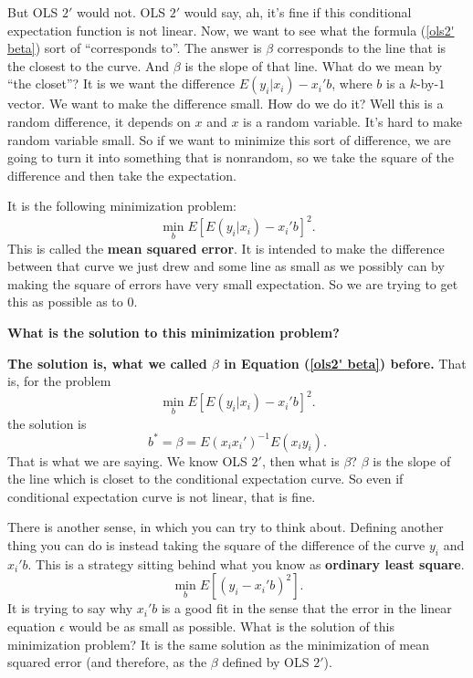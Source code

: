 \documentclass[11pt,a4paper]{amsart}
\theoremstyle{plain}
\theoremstyle{definition}
\begin{document}
 	But OLS $2'$ would not.  OLS $2'$ would say, ah, it's fine if this conditional expectation function is not linear. Now, we want to see what the formula (\ref{ols2' beta}) sort of ``corresponds to''. The answer is $\beta$ corresponds to the line that is the closest to the curve. And $\beta$ is the slope of that line. What do we mean by ``the closet''? It is we want the difference $E(y_{i}|x_{i}) - x_{i}'b$, where $b$ is a $k$-by-$1$ vector.
 	We want to make the difference small. How do we do it? Well this is a random difference, it depends on $x$ and $x$ is a random variable. It's hard to make random variable small. So if we want to minimize this sort of difference, we are going to turn it into something that is nonrandom, so we take the square of the difference and then take the expectation.\par 
	  It is the following minimization problem:
	 \[	\min_{b} E[E(y_{i}|x_{i}) - x_{i}' b]^{2}. 	\]
	This is called the \textbf{mean squared error}. It is intended to make the difference between that curve we just drew and some line as small as we possibly can by making the square of errors have very small expectation. So we are trying to get this as possible as to $0$. \par
	\textbf{What is the solution to this minimization problem?}\par 
	\textbf{The solution is, what we called $\beta$ in Equation (\ref{ols2' beta}) before.}
	That is, for the problem
	\begin{equation}\label{mse}
		\min_{b} E[E(y_{i}|x_{i}) - x_{i}' b]^{2}.
	\end{equation}	
	the solution is 
	\[	b^{*} = \beta = E(x_{i} x_{i}') ^{-1} E(x_{i}y_{i}).	\]
	That is what we are saying. We know OLS $2'$, then what is $\beta$? $\beta$ is the slope of the line which is closet to the conditional expectation curve. So even if conditional expectation curve is not linear, that is fine.\par 
	There is another sense, in which you can try to think about. Defining another thing you can do is instead taking the square of the difference of the curve $y_{i}$ and $x_{i}' b$. This is a strategy sitting behind what you know as \textbf{ordinary least square}. 
	\begin{equation}\label{ols}
	\min_{b} E[(y_{i}-x_{i}' b)^{2}].
	\end{equation}
	It is trying to say why $x_{i}' b$ is a good fit in the sense that the error in the linear equation $\epsilon$ would be as small as possible. What is the solution of this minimization problem? It is the same solution as the minimization of mean squared error (and therefore, as the $\beta$ defined by OLS $2'$).\par 
\end{document}
